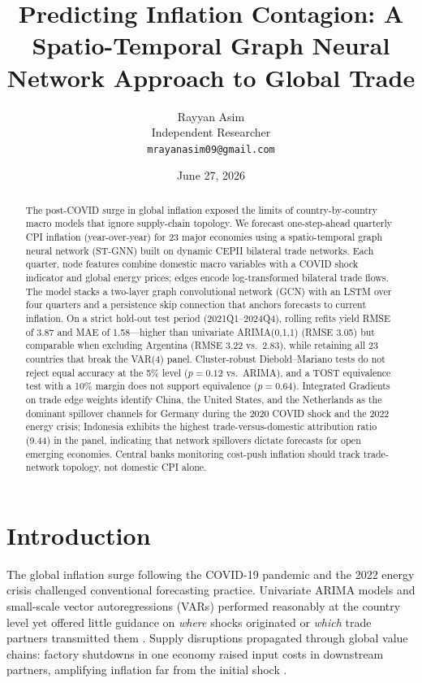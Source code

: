 \documentclass[12pt,a4paper]{article}
\title{Predicting Inflation Contagion: A Spatio-Temporal Graph Neural Network Approach to Global Trade}
\author{Rayyan Asim \\ Independent Researcher \\ \texttt{mrayanasim09@gmail.com}}
\date{June 27, 2026}
\begin{document}
\maketitle

\begin{abstract}
The post-COVID surge in global inflation exposed the limits of country-by-country macro models that ignore supply-chain topology.
We forecast one-step-ahead quarterly CPI inflation (year-over-year) for 23 major economies using a spatio-temporal graph neural network (ST-GNN) built on dynamic CEPII bilateral trade networks.
Each quarter, node features combine domestic macro variables with a COVID shock indicator and global energy prices; edges encode log-transformed bilateral trade flows.
The model stacks a two-layer graph convolutional network (GCN) with an LSTM over four quarters and a persistence skip connection that anchors forecasts to current inflation.
On a strict hold-out test period (2021Q1--2024Q4), rolling refits yield RMSE of 3.87 and MAE of 1.58---higher than univariate ARIMA(0,1,1) (RMSE 3.05) but comparable when excluding Argentina (RMSE 3.22 vs.\ 2.83), while retaining all 23 countries that break the VAR(4) panel.
Cluster-robust Diebold--Mariano tests do not reject equal accuracy at the 5\% level ($p=0.12$ vs.\ ARIMA), and a TOST equivalence test with a 10\% margin does not support equivalence ($p=0.64$).
Integrated Gradients on trade edge weights identify China, the United States, and the Netherlands as the dominant spillover channels for Germany during the 2020 COVID shock and the 2022 energy crisis; Indonesia exhibits the highest trade-versus-domestic attribution ratio (9.44) in the panel, indicating that network spillovers dictate forecasts for open emerging economies.
Central banks monitoring cost-push inflation should track trade-network topology, not domestic CPI alone.
\end{abstract}

\section{Introduction}
\label{sec:intro}

The global inflation surge following the COVID-19 pandemic and the 2022 energy crisis challenged conventional forecasting practice.
Univariate ARIMA models and small-scale vector autoregressions (VARs) performed reasonably at the country level yet offered little guidance on \emph{where} shocks originated or \emph{which} trade partners transmitted them \citep{hamilton2022surge}.
Supply disruptions propagated through global value chains: factory shutdowns in one economy raised input costs in downstream partners, amplifying inflation far from the initial shock \citep{baqaee2020networks, acemoglu2016networks}.
\end{document}
